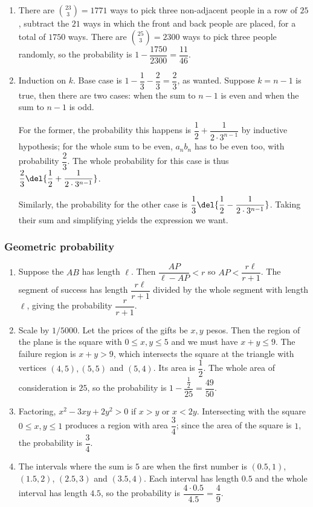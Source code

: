 \documentclass[10pt,paper=letter]{scrartcl}
\begin{document}
\begin{enumerate}
\item There are $\binom{23}3 = 1771$ ways to pick three non-adjacent people in a row of $25$, subtract the $21$ ways in which the front and back people are placed, for a total of $1750$ ways. There are $\binom{25}3 = 2300$ ways to pick three people randomly, so the probability is $1 - \dfrac{1750}{2300} = \dfrac{11}{46}$.

\item Induction on $k$. Base case is $1 - \dfrac13 - \dfrac23 = \dfrac23$, as wanted. Suppose $k = n-1$ is true, then there are two cases: when the sum to $n-1$ is even and when the sum to $n-1$ is odd.

For the former, the probability this happens is $\dfrac12 + \dfrac1{2\cdot3^{n-1}}$ by inductive hypothesis; for the whole sum to be even, $a_nb_n$ has to be even too, with probability $\dfrac23$. The whole probability for this case is thus $\dfrac23 \del{\dfrac12 + \dfrac1{2\cdot3^{n-1}}}$.

Similarly, the probability for the other case is $\dfrac13 \del{\dfrac12 - \dfrac1{2\cdot3^{n-1}}}$. Taking their sum and simplifying yields the expression we want.

\end{enumerate}

\subsubsection*{Geometric probability}

\begin{enumerate}

\item Suppose the $AB$ has length $\ell$. Then $\dfrac{AP}{\ell - AP} < r$ so $AP < \dfrac{r\ell}{r+1}$. The segment of success has length $\dfrac{r\ell}{r+1}$ divided by the whole segment with length $\ell$, giving the probability $\dfrac{r}{r+1}$.

\item Scale by $1/5000$. Let the prices of the gifts be $x, y$ pesos. Then the region of the plane is the square with $0 \leq x, y \leq 5$ and we must have $x + y \leq 9$. The failure region is $x + y > 9$, which intersects the square at the triangle with vertices $(4, 5), (5, 5)$ and $(5, 4)$. Its area is $\dfrac12$. The whole area of consideration is $25$, so the probability is $1 - \dfrac{\frac12}{25} = \dfrac{49}{50}$.

\item Factoring, $x^2 - 3xy + 2y^2 > 0$ if $x > y$ or $x < 2y$. Intersecting with the square $0 \leq x, y \leq 1$ produces a region with area $\dfrac34$; since the area of the square is $1$, the probability is $\dfrac34$.

\item The intervals where the sum is $5$ are when the first number is $(0.5, 1)$, $(1.5, 2)$, $(2.5, 3)$ and $(3.5, 4)$. Each interval has length $0.5$ and the whole interval has length $4.5$, so the probability is $\dfrac{4\cdot0.5}{4.5} = \dfrac49$.

\end{enumerate}
\end{document}

